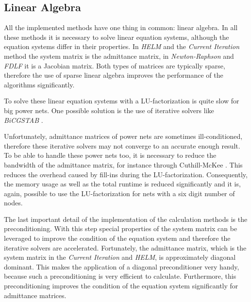 \subsection{Linear Algebra}
All the implemented methods have one thing in common: linear algebra. In all these methods it is necessary to solve linear equation systems, although the equation systems differ in their properties. In \emph{HELM} and the \emph{Current Iteration} method the system matrix is the admittance matrix, in \emph{Newton-Raphson} and \emph{FDLF} it is a Jacobian matrix. Both types of matrices are typically sparse, therefore the use of sparse linear algebra improves the performance of the algorithms significantly.

To solve these linear equation systems with a LU-factorization is quite slow for big power nets. One possible  solution is the use of iterative solvers like \emph{BiCGSTAB} \cite{bicgstab}.

Unfortunately, admittance matrices of power nets are sometimes ill-conditioned, therefore these iterative solvers may not converge to an accurate enough result. To be able to handle these power nets too, it is necessary to reduce the bandwidth of the admittance matrix, for instance through Cuthill-McKee \cite{cuthill}. This reduces the overhead caused by fill-ins during the LU-factorization. Consequently, the memory usage as well as the total runtime is reduced significantly and it is, again, possible to use the LU-factorization for nets with a six digit number of nodes.

The last important detail of the implementation of the calculation methods is the preconditioning. With this step special properties of the system matrix can be leveraged to improve the condition of the equation system and therefore the iterative solvers are accelerated. Fortunately, the admittance matrix, which is the system matrix in the \emph{Current Iteration} and \emph{HELM}, is approximately diagonal dominant. This makes the application of a diagonal preconditioner very handy, because such a preconditioning is very efficient to calculate. Furthermore, this preconditioning improves the condition of the equation system significantly for admittance matrices.

